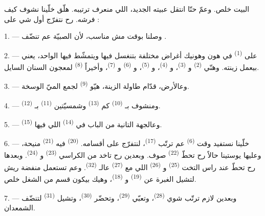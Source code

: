 \VUsaut{6.0mm}
\VUsaut{1.4mm}
\VUsaut{0.4mm}
\VUsaut{2.2mm}

البيت خلص. وعمّ حنّا انتقل عبيته الجديد، اللي منعرف ترتيبه. هلّق
خلّينا نشوف كيف فرشه. رح نتفرّج أول شي على :

\VUsaut{3.0mm}

1. --- وصلنا بوقت مش مناسب، لأن الصبيّة عم تنضّف .

2. --- على  \textsuperscript{(1)} في هون وهونيك أغراض
مختلفة بتنغسل فيها ويتمشّط فيها الواحد، يعني بيعمل زينته. وهنّي
 \textsuperscript{(2)} و \textsuperscript{(3)}،
و \textsuperscript{(4)}، و
\textsuperscript{(5)}، و \textsuperscript{(6)}
و \textsuperscript{(7)}، وأخيراً 
\textsuperscript{(8)} لمعجون السنان السايل.

3. --- وعالأرض، قدّام طاولة الزينة، هيّو 
\textsuperscript{(9)} لجمع الميّ الوسخة.

4. --- ومنشوف بـ \textsuperscript{(10)} كم
 \textsuperscript{(13)} وشمسيّتين \textsuperscript{(11)}
بـ \textsuperscript{(12)}.

5. --- وعالجهة التانية من الباب في 
\textsuperscript{(14)} اللي فيها  \textsuperscript{(15)}.

6. --- خلّينا نستفيد وقت  \textsuperscript{(6)} عم ترتّب
 \textsuperscript{(17)}، لنتفرّج على أقسامه.  \textsuperscript{(20)} فيه 
\textsuperscript{(21)} منيحة، وعليها يوستينا حالاً رح تحطّ 
\textsuperscript{(22)} صوف. وبعدين رح تاخد من الكراسي 
\textsuperscript{(23)} و \textsuperscript{(24)}. وبعدها رح تحطّ
عند راس التخت  \textsuperscript{(25)}
و \textsuperscript{(26)} اللي مع 
\textsuperscript{(27)} عالـ \textsuperscript{(32)}. وعم تستعمل
منفضة ريش لتشيل الغبرة عن  \textsuperscript{(19)}
و \textsuperscript{(18)}، وهيك بيكون قسم من الشغل
خلص.

7. --- وبعدين لازم ترتّب شوي 
\textsuperscript{(28)}، وتعبّي  \textsuperscript{(29)}،
وتحضّر  \textsuperscript{(30)}، وتشيل 
\textsuperscript{(31)} لتنضّف الشمعدان.

